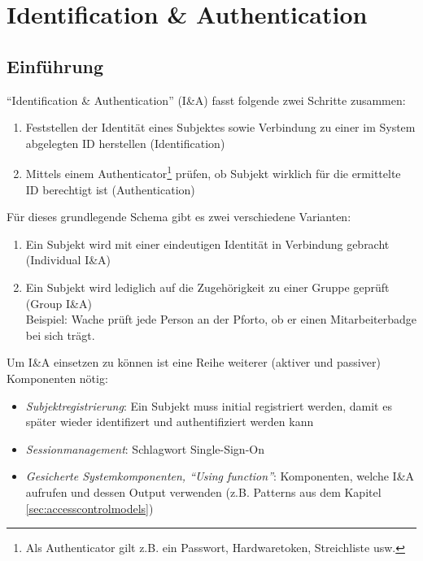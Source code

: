 \chapter{Identification \& Authentication}
\label{sec:ianda}

\section{Einführung}

``Identification \& Authentication'' (I\&A) fasst folgende zwei Schritte zusammen:

\begin{enumerate}
	\item Feststellen der Identität eines Subjektes sowie Verbindung zu einer im System abgelegten ID herstellen (Identification)
	\item Mittels einem Authenticator\footnote{Als Authenticator gilt z.B. ein Passwort, Hardwaretoken, Streichliste usw.} prüfen, ob Subjekt wirklich für die ermittelte ID berechtigt ist (Authentication)
\end{enumerate}

Für dieses grundlegende Schema gibt es zwei verschiedene Varianten:

\begin{enumerate}
	\item Ein Subjekt wird mit einer eindeutigen Identität in Verbindung gebracht (Individual I\&A)
	\item Ein Subjekt wird lediglich auf die Zugehörigkeit zu einer Gruppe geprüft (Group I\&A)\\
	Beispiel: Wache prüft jede Person an der Pforto, ob er einen Mitarbeiterbadge bei sich trägt.
\end{enumerate}

Um I\&A einsetzen zu können ist eine Reihe weiterer (aktiver und passiver) Komponenten nötig:
\begin{itemize}
	\item \emph{Subjektregistrierung}: Ein Subjekt muss initial registriert werden, damit es später wieder identifizert und authentifiziert werden kann
	\item \emph{Sessionmanagement}: Schlagwort Single-Sign-On
	\item \emph{Gesicherte Systemkomponenten, ``Using function''}: Komponenten, welche I\&A aufrufen und dessen Output verwenden (z.B. Patterns aus dem Kapitel \ref{sec:accesscontrolmodels})
\end{itemize}


